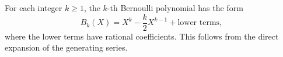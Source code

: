 For each integer $k \geq 1$, the $k$-th Bernoulli polynomial has the form
$$B_k(X) = X^k - \frac{k}{2} X^{k-1} + \text{lower terms},$$
where the lower terms have rational coefficients. This follows from the direct expansion of the generating series.
